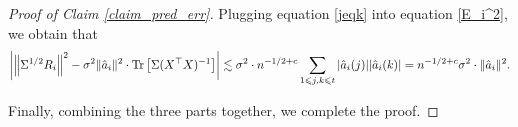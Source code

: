 \begin{proof}[Proof of Claim \ref{claim_pred_err}]
	Plugging equation \eqref{jeqk} into equation \eqref{E_i^2}, we obtain that 
	\begin{align*}
		{\left| {\left\| \Sigma^{1/2} R_i \right\|^2 -  \sigma^2 \|\hat a_i\|^2 \cdot\operatorname{Tr}\left[\Sigma(X^\top X)^{-1}\right]} \right|} \lesssim  \sigma^2 \cdot n^{-1/2+c}  \sum_{1\leqslant j,k\leqslant t}|\hat a_i(j)||\hat a_i(k)| =  n^{-1/2+c} \sigma^2 \cdot  \|\hat a_i\|^2.
	\end{align*}

	Finally, combining the three parts together, we complete the proof.
\end{proof}

